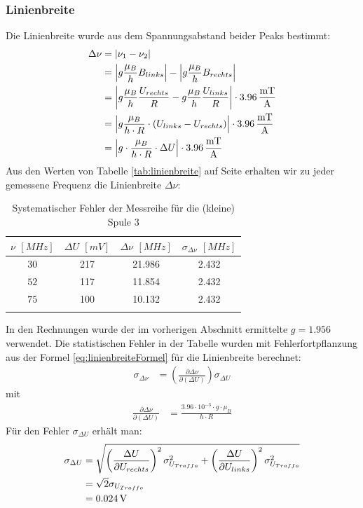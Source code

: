 \documentclass[a4paper,titlepage]{scrartcl}
\numberwithin{equation}{section}
\begin{document}
\subsubsection{Linienbreite}
Die Linienbreite wurde aus dem Spannungsabstand beider Peaks bestimmt:
\begin{align}
\Delta \nu&=|\nu_1-\nu_2| \nonumber \\
&=\left| g \frac{\mu_B}{h} B_{links} \right| -\left| g \frac{\mu_B}{h} B_{rechts} \right|  \nonumber \\
&=\left| g \frac{\mu_B}{h} \frac{U_{rechts}}{R} - g \frac{\mu_B}{h} \frac{U_{links}}{R} \right| \cdot \unit[3.96]{\frac{mT}{A}} \nonumber \\
&=\left| g \frac{\mu_B}{h \cdot R} \cdot (U_{links}-U_{rechts}) \right| \cdot \unit[3.96]{\frac{mT}{A}} \nonumber \\
&=\left| g \cdot \frac{\mu_B}{h \cdot R} \cdot \Delta U \right| \cdot \unit[3.96]{\frac{mT}{A}} \label{eq:linienbreiteFormel}
\end{align}
Aus den Werten von Tabelle \ref{tab:linienbreite} auf Seite \pageref{tab:linienbreite} erhalten wir zu jeder gemessene Frequenz die Linienbreite $\Delta \nu$:
\begin{longtable}[H]{c|c|c|c}
$\nu$ $[MHz]$ & $\Delta U$ $[mV]$ & $\Delta \nu$ $[MHz]$ & $\sigma_{\Delta \nu}$ $[MHz]$ \\
\hline
$30$ & 217 & 21.986 & 2.432\\
$52$ & 117 & 11.854 & 2.432\\
$75$ & 100 & 10.132 & 2.432\\
\caption{Systematischer Fehler der Messreihe für die (kleine) Spule 3}
\label{tab:linienbreite1}
\end{longtable}
In den Rechnungen wurde der im vorherigen Abschnitt ermittelte $g=1.956$ verwendet. Die statistischen Fehler in der Tabelle wurden mit Fehlerfortpflanzung aus der Formel \ref{eq:linienbreiteFormel} für die Linienbreite berechnet:
\begin{align*}
\sigma_{\Delta \nu}&=\left( \frac{\partial \Delta \nu}{\partial (\Delta U)} \right) \sigma_{\Delta U}
\end{align*}
mit
\begin{align*}
\frac{\partial \Delta \nu}{\partial (\Delta U)}&=\frac{3.96 \cdot 10^{-3} \cdot g \cdot \mu_B}{h \cdot R}
\end{align*}
Für den Fehler $\sigma_{\Delta U}$ erhält man:
\begin{align*}
\sigma_{\Delta U}&=\sqrt{\left( \frac{\Delta U}{\partial U_{rechts}} \right)^2 \sigma^2_{U_{Traffo}} + \left( \frac{\Delta U}{\partial U_{links}} \right)^2 \sigma^2_{U_{Traffo}}}\\
&=\sqrt{2} \sigma_{U_{Traffo}}\\
&=\unit[0.024]{V}
\end{align*}
\end{document}
